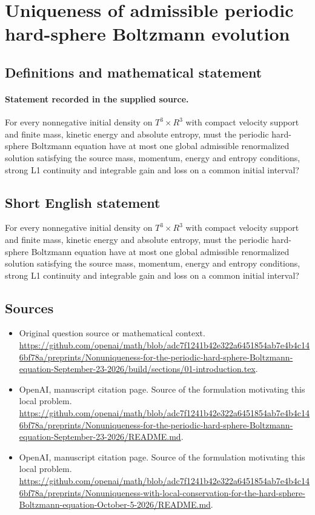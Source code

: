 \documentclass[11pt]{article}
\begin{document}
\section*{Uniqueness of admissible periodic hard-sphere Boltzmann evolution}\label{statement}
\subsection{Definitions and mathematical statement}
\paragraph{Statement recorded in the supplied source.}
For every nonnegative initial density on $T^3×R^3$ with compact velocity support and finite mass, kinetic energy and absolute entropy, must the periodic hard-sphere Boltzmann equation have at most one global admissible renormalized solution satisfying the source mass, momentum, energy and entropy conditions, strong L1 continuity and integrable gain and loss on a common initial interval?
\subsection{Short English statement}
For every nonnegative initial density on $T^3×R^3$ with compact velocity support and finite mass, kinetic energy and absolute entropy, must the periodic hard-sphere Boltzmann equation have at most one global admissible renormalized solution satisfying the source mass, momentum, energy and entropy conditions, strong L1 continuity and integrable gain and loss on a common initial interval?
\subsection{Sources}
\begin{itemize}
\item[S1] Original question source or mathematical context.
\url{https://github.com/openai/math/blob/adc7f1241b42e322a6451854ab7e4b4c146bf78a/preprints/Nonuniqueness-for-the-periodic-hard-sphere-Boltzmann-equation-September-23-2026/build/sections/01-introduction.tex}.
\item[S2] OpenAI, manuscript citation page. Source of the formulation motivating this local problem.
\url{https://github.com/openai/math/blob/adc7f1241b42e322a6451854ab7e4b4c146bf78a/preprints/Nonuniqueness-for-the-periodic-hard-sphere-Boltzmann-equation-September-23-2026/README.md}.
\item[S3] OpenAI, manuscript citation page. Source of the formulation motivating this local problem.
\url{https://github.com/openai/math/blob/adc7f1241b42e322a6451854ab7e4b4c146bf78a/preprints/Nonuniqueness-with-local-conservation-for-the-hard-sphere-Boltzmann-equation-October-5-2026/README.md}.
\end{itemize}
\end{document}
